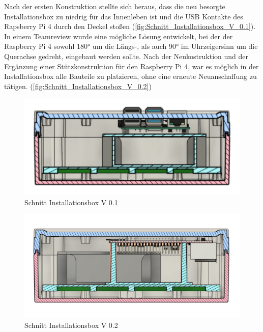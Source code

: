 Nach der ersten Konstruktion stellte sich heraus, dass die neu besorgte Installationsbox zu niedrig für das Innenleben ist und die USB Kontakte des Rapsberry Pi 4 durch den Deckel stoßen (\autoref{fig:Schnitt_Installationsbox_V_0.1}). In einem Teamreview wurde eine mögliche Lösung entwickelt, bei der der Raspberry Pi 4 sowohl \ang{180} um die Längs-, als auch \ang{90} im Uhrzeigersinn um die Querachse gedreht, eingebaut werden sollte. Nach der Neukostruktion und der Ergänzung einer Stützkonstruktion für den Raspberry Pi 4, war es möglich in der Installationsbox alle Bauteile zu platzieren, ohne eine erneute Neuanschaffung zu tätigen. (\autoref{fig:Schnitt_Installationsbox_V_0.2})

\begin{figure}[h]
	\begin{center}
		\includegraphics[scale=0.25]{Sections/Konstruktion_des_Aufbaus/Schnitt_Installationsbox_V_0.1}
	\end{center}
	\caption{Schnitt Installationsbox V 0.1}
	\label{fig:Schnitt_Installationsbox_V_0.1}
\end{figure}

\newpage

\begin{figure}[h]
	\begin{center}
		\includegraphics[scale=0.28]{Sections/Konstruktion_des_Aufbaus/Schnitt_Installationsbox_V_0.2}
	\end{center}
	\caption{Schnitt Installationsbox V 0.2}
	\label{fig:Schnitt_Installationsbox_V_0.2}
\end{figure}

